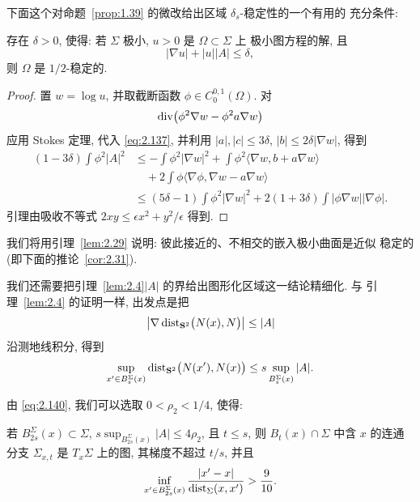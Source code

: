 下面这个对命题~\ref{prop:1.39} 的微改给出区域 $\delta_s$-稳定性的一个有用的
充分条件:

\begin{lemma}
\label{lem:2.29}
存在 $\delta>0$, 使得: 若 $\Sigma$ 极小, $u>0$ 是 $\Omega\subset\Sigma$ 上
极小图方程的解, 且
\[
|\nabla u|+|u||A|\leq\delta,
\]
则 $\Omega$ 是 $1/2$-稳定的.
\end{lemma}

\begin{proof}
置 $w=\log u$, 并取截断函数 $\phi\in C_0^{0,1}(\Omega)$. 对
\[
\operatorname{div}\bigl(\phi^{2}\nabla w-\phi^{2}a\nabla w\bigr)
\]
应用 Stokes 定理, 代入 \eqref{eq:2.137}, 并利用 $|a|,|c|\leq3\delta$,
$|b|\leq2\delta|\nabla w|$, 得到
\begin{equation}
\begin{aligned}
(1-3\delta)\int\phi^{2}|A|^{2}
&\leq-\int\phi^{2}|\nabla w|^{2}
 +\int\phi^{2}\langle\nabla w,b+a\nabla w\rangle\\
&\quad +2\int\phi\langle\nabla\phi,\nabla w-a\nabla w\rangle\\
&\leq(5\delta-1)\int\phi^{2}|\nabla w|^{2}
 +2(1+3\delta)\int|\phi\nabla w||\nabla\phi|.
\end{aligned}
\label{eq:2.138}
\end{equation}
引理由吸收不等式 $2xy\leq\epsilon x^{2}+y^{2}/\epsilon$ 得到.
\end{proof}

我们将用引理~\ref{lem:2.29} 说明: 彼此接近的、不相交的嵌入极小曲面是近似
稳定的(即下面的推论~\ref{cor:2.31}).

我们还需要把引理~\ref{lem:2.4}$|A|$ 的界给出图形化区域这一结论精细化. 与
引理~\ref{lem:2.4} 的证明一样, 出发点是把
\begin{equation}
\bigl|\nabla\operatorname{dist}_{\mathbf{S}^{2}}\bigl(N(x),N\bigr)\bigr|\leq|A|
\label{eq:2.139}
\end{equation}
沿测地线积分, 得到
\begin{equation}
\sup_{x'\in B_s^{\Sigma}(x)}\operatorname{dist}_{\mathbf{S}^{2}}\bigl(N(x'),N(x)\bigr)
 \leq s\sup_{B_s^{\Sigma}(x)}|A|.
\label{eq:2.140}
\end{equation}

由 \eqref{eq:2.140}, 我们可以选取 $0<\rho_2<1/4$, 使得:

若 $B_{2s}^{\Sigma}(x)\subset\Sigma$,
$s\sup_{B_{2s}^{\Sigma}(x)}|A|\leq4\rho_2$, 且 $t\leq s$, 则
$B_t(x)\cap\Sigma$ 中含 $x$ 的连通分支 $\Sigma_{x,t}$ 是 $T_x\Sigma$ 上的图,
其梯度不超过 $t/s$, 并且
\begin{equation}
\inf_{x'\in B_{2s}^{\Sigma}(x)}
 \frac{|x'-x|}{\operatorname{dist}_{\Sigma}(x,x')}>\frac{9}{10}.
\label{eq:2.141}
\end{equation}

